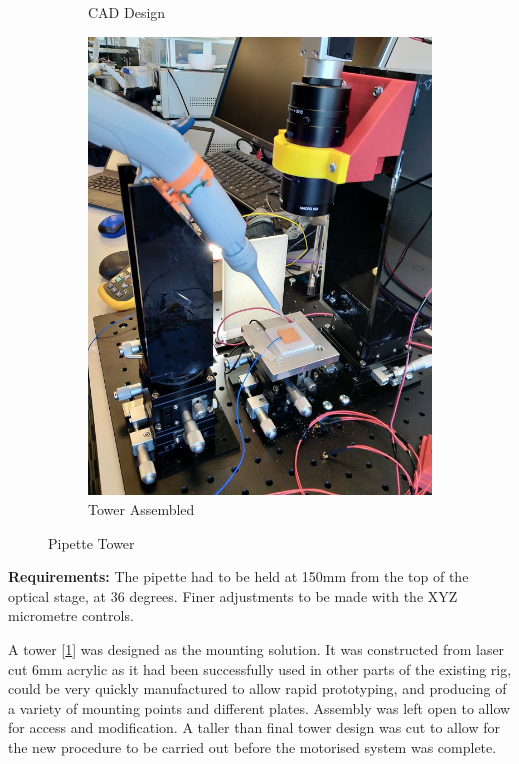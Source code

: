 \begin{figure}
\begin{subfigure}{.3\textwidth}
      \caption{CAD Design}
    \end{subfigure}
    \begin{subfigure}{.3\textwidth}
        \centering
        \includegraphics[height=\linewidth]{img/Tower_ass.jpg}
        \caption{Tower Assembled}
      \end{subfigure}
    \caption{Pipette Tower}
    \label{fig:tower}
  \end{figure}

\textbf{Requirements:} The pipette had to be held at 150mm from the top of the optical stage, at 36 degrees. Finer adjustments to be made with the XYZ micrometre controls. 

A tower [\ref{fig:tower}] was designed as the mounting solution. It was constructed from laser cut 6mm acrylic as it had been successfully used in other parts of the existing rig, could be very quickly manufactured to allow rapid prototyping, and producing of a variety of mounting points and different plates. Assembly was left open to allow for access and modification. A taller than final tower design was cut to allow for the new procedure to be carried out before the motorised system was complete.  

